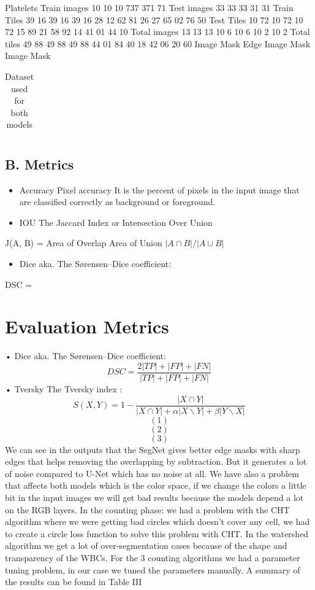 \documentclass[conference]{IEEEtran}
\begin{document}
Platelets
Train images 10 10 10 737 371 71
Test images 33 33 33 31 31
Train Tiles 39 16 39 16 39 16 28 12 62 81 26 27 65 02 76 50
Test Tiles 10 72 10 72 10 72 15 89 21 58 92 14 41 01 44 10
Total images 13 13 13 10 6 10 6 10 2 10 2
Total tiles 49 88 49 88 49 88 44 01 84 40 18 42 06 20 60
Image Mask Edge Image Mask Image Mask
\begin{table}[htbp]
\centering
\caption{Dataset used for both models}
\label{tab:label}
\begin{tabular}{lll}
\hline
& & \\
\hline
\end{tabular}
\end{table}
\subsection{B. Metrics}
\begin{itemize}
\item Accuracy Pixel accuracy It is the percent of pixels in the input image that are classified correctly as background or foreground.
\item IOU The Jaccard Index or Intersection Over Union
\end{itemize}
J(A, B) = 
Area of Overlap Area of Union
$|A \cap B| / |A \cup B|$
\begin{itemize}
\item Dice aka. The Sørensen–Dice coefficient:
\end{itemize}
DSC =

\section{Evaluation Metrics}
• Dice aka. The Sørensen–Dice coefficient:
\[ DSC = \frac{2|TP| + |FP| + |FN|}{|TP| + |FP| + |FN|} \]
• Tversky The Tversky index :
\[ S(X, Y ) = 1 - \frac{|X \cap Y|}{|X \cap Y| + \alpha|X\backslash Y| + \beta|Y\backslash X|} \]
\[ (1) \]
\[ (2) \]
\[ (3) \]
We can see in the outputs that the SegNet gives better edge masks with sharp edges that helps removing the overlapping by subtraction. But it generates a lot of noise compared to U-Net which has no noise at all.
We have also a problem that affects both models which is the color space, if we change the colors a little bit in the input images we will get bad results because the models depend a lot on the RGB layers.
In the counting phase: we had a problem with the CHT algorithm where we were getting bad circles which doesn’t cover any cell, we had to create a circle loss function to solve this problem with CHT. In the watershed algorithm we get a lot of over-segmentation cases because of the shape and transparency of the WBCs. For the 3 counting algorithms we had a parameter tuning problem, in our case we tuned the parameters manually. A summary of the results can be found in Table III
\end{document}
